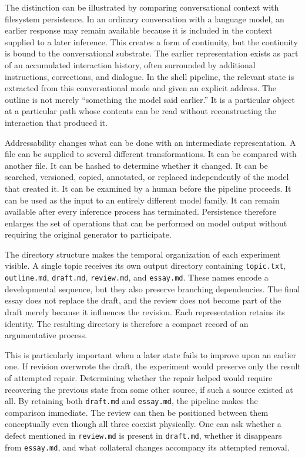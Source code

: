 \documentclass[11pt]{article}
\begin{document}
The distinction can be illustrated by comparing conversational context with filesystem persistence. In an ordinary conversation with a language model, an earlier response may remain available because it is included in the context supplied to a later inference. This creates a form of continuity, but the continuity is bound to the conversational substrate. The earlier representation exists as part of an accumulated interaction history, often surrounded by additional instructions, corrections, and dialogue. In the shell pipeline, the relevant state is extracted from this conversational mode and given an explicit address. The outline is not merely ``something the model said earlier.'' It is a particular object at a particular path whose contents can be read without reconstructing the interaction that produced it.

Addressability changes what can be done with an intermediate representation. A file can be supplied to several different transformations. It can be compared with another file. It can be hashed to determine whether it changed. It can be searched, versioned, copied, annotated, or replaced independently of the model that created it. It can be examined by a human before the pipeline proceeds. It can be used as the input to an entirely different model family. It can remain available after every inference process has terminated. Persistence therefore enlarges the set of operations that can be performed on model output without requiring the original generator to participate.

The directory structure makes the temporal organization of each experiment visible. A single topic receives its own output directory containing \texttt{topic.txt}, \texttt{outline.md}, \texttt{draft.md}, \texttt{review.md}, and \texttt{essay.md}. These names encode a developmental sequence, but they also preserve branching dependencies. The final essay does not replace the draft, and the review does not become part of the draft merely because it influences the revision. Each representation retains its identity. The resulting directory is therefore a compact record of an argumentative process.

This is particularly important when a later state fails to improve upon an earlier one. If revision overwrote the draft, the experiment would preserve only the result of attempted repair. Determining whether the repair helped would require recovering the previous state from some other source, if such a source existed at all. By retaining both \texttt{draft.md} and \texttt{essay.md}, the pipeline makes the comparison immediate. The review can then be positioned between them conceptually even though all three coexist physically. One can ask whether a defect mentioned in \texttt{review.md} is present in \texttt{draft.md}, whether it disappears from \texttt{essay.md}, and what collateral changes accompany its attempted removal.
\end{document}
